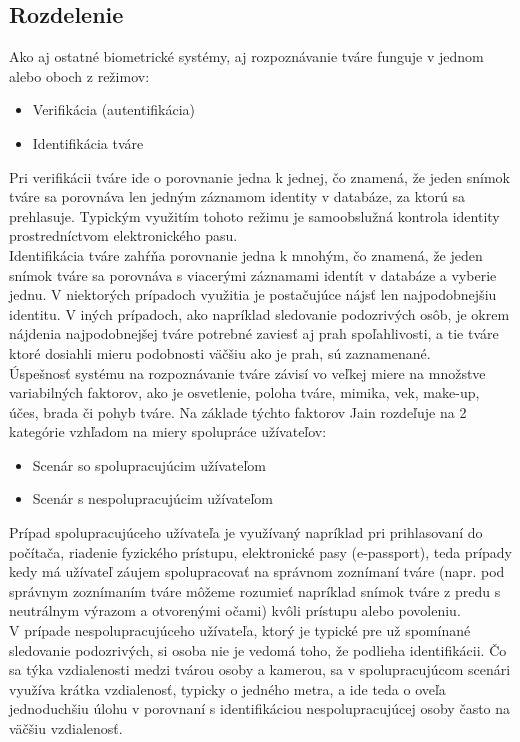 \subsection{Rozdelenie}
Ako aj ostatné biometrické systémy, aj rozpoznávanie tváre funguje v jednom alebo oboch z režimov:
\begin{itemize}
    \item Verifikácia (autentifikácia)
    \item Identifikácia tváre
\end{itemize}

Pri verifikácii tváre ide o porovnanie jedna k jednej, čo znamená, že jeden snímok tváre sa porovnáva len jedným záznamom identity v databáze, za ktorú sa prehlasuje.
Typickým využitím tohoto režimu je samoobslužná kontrola identity prostredníctvom elektronického pasu\cite{handbookface}.\\
\indent Identifikácia tváre zahŕňa porovnanie jedna k mnohým, čo znamená, že jeden snímok tváre sa porovnáva s viacerými záznamami identít v databáze a vyberie jednu\cite{handbookface}.
V niektorých prípadoch využitia je postačujúce nájsť len najpodobnejšiu identitu.
V iných prípadoch, ako napríklad sledovanie podozrivých osôb,
je okrem nájdenia najpodobnejšej tváre potrebné zaviesť aj prah spoľahlivosti, a tie tváre ktoré dosiahli mieru podobnosti väčšiu ako je prah, sú zaznamenané.\\
\indent Úspešnosť systému na rozpoznávanie tváre závisí vo veľkej miere na množstve variabilných faktorov, ako je osvetlenie, poloha tváre, mimika, vek, make-up, účes,
brada či pohyb tváre. Na základe týchto faktorov Jain rozdeľuje\cite{hanbookface} na 2 kategórie vzhľadom na miery spolupráce užívateľov:

\begin{itemize}
    \item Scenár so spolupracujúcim užívateľom
    \item Scenár s nespolupracujúcim užívateľom
\end{itemize}

\indent Prípad spolupracujúceho užívateľa je využívaný napríklad pri prihlasovaní do počítača, riadenie fyzického prístupu, elektronické pasy (e-passport), teda prípady kedy má
užívateľ záujem spolupracovať na správnom zoznímaní tváre (napr. pod správnym zoznímaním tváre môžeme rozumieť napríklad snímok tváre z predu s neutrálnym výrazom a otvorenými očami)
kvôli prístupu alebo povoleniu.\\
\indent V prípade nespolupracujúceho užívateľa, ktorý je typické pre už spomínané sledovanie podozrivých, si osoba nie je vedomá toho, že podlieha identifikácii.
Čo sa týka vzdialenosti
medzi tvárou osoby a kamerou, sa v spolupracujúcom scenári využíva krátka vzdialenosť, typicky o jedného metra, a ide teda o oveľa jednoduchšiu úlohu v porovnaní s identifikáciou
nespolupracujúcej osoby často na väčšiu vzdialenosť.

